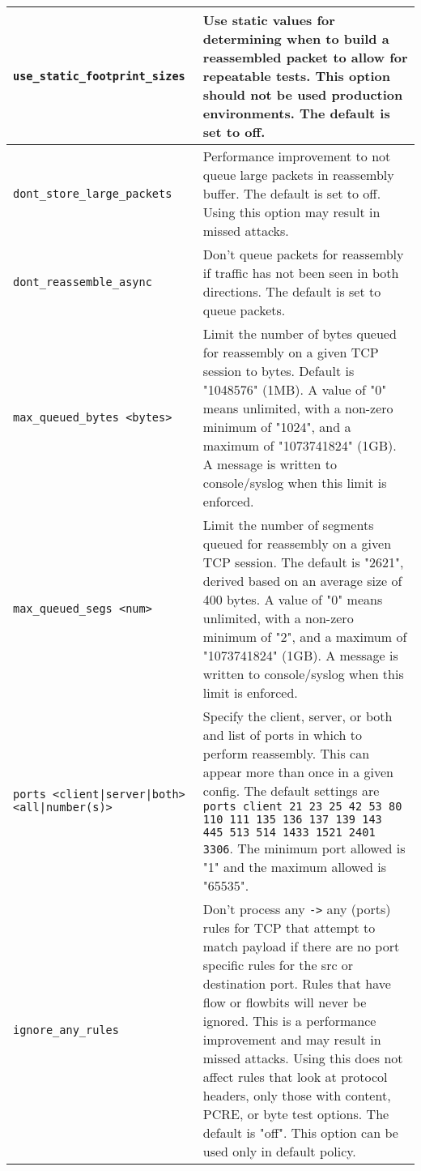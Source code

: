 \documentclass[english]{report}
\begin{document}
\begin{longtable}[h]{| p{2in} | p{4in} |}
\hline
\texttt{use\_static\_footprint\_sizes} &

Use static values for determining when to build a reassembled packet to
allow for repeatable tests.  This option should not be used production
environments.  The default is set to off.\\

\hline
\texttt{dont\_store\_large\_packets} &

Performance improvement to not queue large packets in reassembly buffer.  The
default is set to off.  Using this option may result in missed attacks.\\

\hline
\texttt{dont\_reassemble\_async} &

Don't queue packets for reassembly if traffic has not been seen in both
directions.  The default is set to queue packets.\\

\hline
\texttt{max\_queued\_bytes <bytes>} &

Limit the number of bytes queued for reassembly on a given TCP session to
bytes.  Default is "1048576" (1MB).  A value of "0" means unlimited, with a
non-zero minimum of "1024", and a maximum of "1073741824" (1GB).  A message is
written to console/syslog when this limit is enforced.\\

\hline
\texttt{max\_queued\_segs <num>} &

Limit the number of segments queued for reassembly on a given TCP session.  The
default is "2621", derived based on an average size of 400 bytes.  A value of
"0" means unlimited, with a non-zero minimum of "2", and a maximum of
"1073741824" (1GB).  A message is written to console/syslog when this limit is
enforced.\\

\hline
\texttt{ports <client|server|both> <all|number(s)>} &


Specify the client, server, or both and list of ports in which to perform
reassembly.  This can appear more than once in a given config.  The default
settings are \texttt{ports client 21 23 25 42 53 80 110 111 135 136 137 139 143
445 513 514 1433 1521 2401 3306}.  The minimum port allowed is "1" and the
maximum allowed is "65535".\\

\hline
\texttt{ignore\_any\_rules} &

Don't process any \texttt{->} any (ports) rules for TCP that attempt to match
payload if there are no port specific rules for the src or destination port.
Rules that have flow or flowbits will never be ignored.  This is a performance
improvement and may result in missed attacks.  Using this does not affect rules
that look at protocol headers, only those with content, PCRE, or byte test
options.  The default is "off". This option can be used only in default
policy.\\

\hline
\end{longtable}
\end{document}
